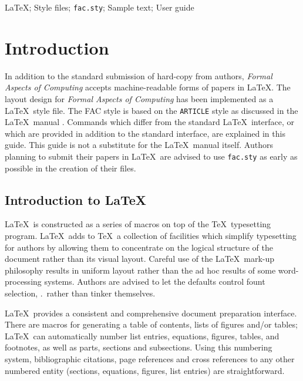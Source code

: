 \begin{keywords}
\LaTeX; Style files; \verb"fac.sty"; Sample text; User guide
\end{keywords}

\begin{abstract}
This guide is for authors who are preparing papers for
{\em Formal Aspects of Computing\/} using the \LaTeX\ document
preparation system and the FAC style file.
\end{abstract}

\section{Introduction}

In addition to the standard submission of hard-copy from authors,
{\em Formal Aspects of Computing\/} accepts machine-readable forms of
papers in \LaTeX.
The layout design for {\em Formal Aspects of Computing\/} has been
implemented as a \LaTeX\ style file.
The FAC style is based on the \verb"ARTICLE" style as discussed in the
\LaTeX\ manual \cite{Lam:LaTeX}.
Commands which differ from the standard \LaTeX\ interface, or which are
provided in addition to the standard interface, are explained in this
guide. This guide is not a substitute for the \LaTeX\ manual itself.
Authors planning to submit their papers in \LaTeX\ are advised to use
\verb"fac.sty" as early as possible in the creation of their files.

\subsection{Introduction to \LaTeX}

\LaTeX\ is constructed as a series of macros on top of the \TeX\
typesetting program.
\LaTeX\ adds to \TeX\ a collection of facilities which simplify typesetting
for authors by allowing them to concentrate on the logical structure of the
document rather than its visual layout.
Careful use of the \LaTeX\ mark-up philosophy results in uniform
layout rather than the {ad hoc} results of some word-processing systems.
Authors are advised to let the defaults control fount selection, \etc.\
rather than tinker themselves.

\LaTeX\ provides a consistent and comprehensive document preparation
interface. There are macros for generating a table of contents,
lists of figures and/or tables;
\LaTeX\ can automatically number list entries, equations, figures, tables,
and footnotes, as well as parts, sections and subsections.
Using this numbering system, bibliographic citations, page references and
cross references to any other numbered entity (\eg sections, equations,
figures, list entries) are straightforward.

